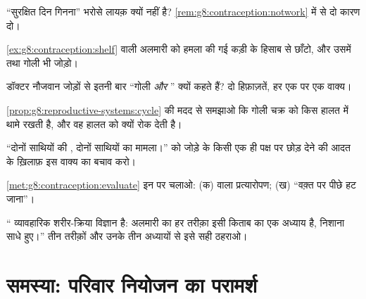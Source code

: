 \begin{exercise}[$\star$]\label{exo:g8:contraception:6}
``सुरक्षित दिन गिनना'' भरोसे लायक़ क्यों नहीं है?
\cref{rem:g8:contraception:notwork} में से दो कारण दो।
\end{exercise}

\begin{exercise}[$\star\star$]\label{exo:g8:contraception:7}
\cref{ex:g8:contraception:shelf} वाली अलमारी को हमला की गई कड़ी के
हिसाब से छाँटो, और उसमें  तथा गोली भी जोड़ो।
\end{exercise}

\begin{exercise}[$\star\star$]\label{exo:g8:contraception:8}
डॉक्टर नौजवान जोड़ों से इतनी बार ``गोली \emph{और} '' क्यों कहते
हैं? दो हिफ़ाज़तें, हर एक पर एक वाक्य।
\end{exercise}

\begin{exercise}[$\star\star$]\label{exo:g8:contraception:9}
\cref{prop:g8:reproductive-systems:cycle} की मदद से समझाओ कि गोली चक्र
को किस हालत में थामे रखती है, और वह हालत  को क्यों रोक देती
है।
\end{exercise}

\begin{exercise}[$\star\star$]\label{exo:g8:contraception:10}
``दोनों साथियों की , दोनों साथियों का मामला।''  को
जोड़े के किसी एक ही पक्ष पर छोड़ देने की आदत के ख़िलाफ़ इस वाक्य का बचाव
करो।
\end{exercise}

\begin{exercise}[$\star\star$]\label{exo:g8:contraception:11}
\cref{met:g8:contraception:evaluate} इन पर चलाओ: (क)  वाला
प्रत्यारोपण; (ख) ``वक़्त पर पीछे हट जाना''।
\end{exercise}

\begin{exercise}[$\star\star\star$]\label{exo:g8:contraception:12}
`` व्यावहारिक शरीर-क्रिया विज्ञान है: अलमारी का हर तरीक़ा इसी
किताब का एक अध्याय है, निशाना साधे हुए।'' तीन तरीक़ों और उनके तीन
अध्यायों से इसे सही ठहराओ।
\end{exercise}

\section{समस्या: परिवार नियोजन का परामर्श}

